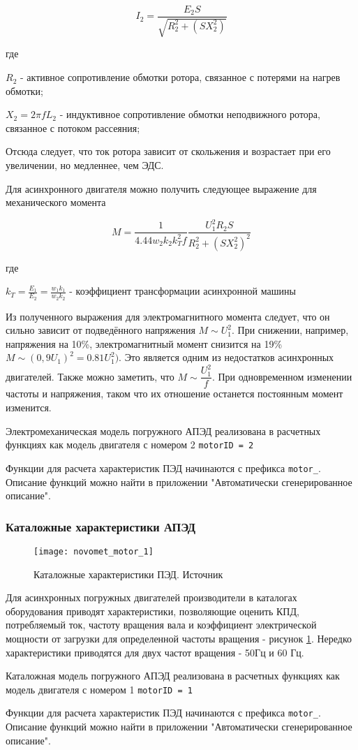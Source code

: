 $$  I_2 = \frac{E_2 S}{\sqrt{R_2^2+(S X_2^2)}} $$

где 

$R_2$ -  активное сопротивление обмотки ротора, связанное с потерями на нагрев обмотки;  

$X_2 = 2 \pi f L_2$ - индуктивное сопротивление обмотки неподвижного ротора, связанное с потоком рассеяния;

Отсюда следует, что ток ротора зависит от скольжения и возрастает при его увеличении, но медленнее, чем ЭДС.

Для асинхронного двигателя можно получить следующее выражение для механического момента 

$$ M = \frac{1}{4.44 w_2 k_2 k_T^2 f} \frac{U_1^2 R_2 S}{R_2^2 + (S X_2^2)^2}$$

где 

$k_T = \frac{E_1}{E_2} = \frac{w_1 k_1}{w_2 k_2}$ - коэффициент трансформации асинхронной машины

Из полученного выражения для электромагнитного момента следует, что он сильно зависит от подведённого напряжения $M \sim U_1^2$. При снижении, например, напряжения на 10\%, электромагнитный момент снизится на 19\% $M \sim (0,9U_1)^2=0.81 U_1^2)$. Это является одним из недостатков асинхронных двигателей. Также можно заметить, что $M \sim \dfrac{U_1^2}{f} $. При одновременном изменении частоты и напряжения, таком что их отношение останется постоянным момент изменится. 


Электромеханическая модель погружного АПЭД реализована в расчетных функциях \unf{} как модель двигателя с номером 2  \texttt{motorID = 2}

Функции для расчета характеристик ПЭД начинаются с префикса \texttt{motor_}. Описание функций можно найти в приложении "Автоматически сгенерированное описание".

\subsubsection{Каталожные характеристики АПЭД}

\begin{figure}[H]
	\centering
	\texttt{[image: novomet\_motor\_1]}
	\caption{Каталожные характеристики ПЭД. Источник \cite{Novomet_2013} }
	\label{ris:novomet_motor_1}
\end{figure}

Для асинхронных погружных двигателей производители в каталогах оборудования приводят характеристики, позволяющие оценить КПД, потребляемый ток, частоту вращения вала и коэффициент электрической мощности от загрузки для определенной частоты вращения - рисунок \ref{ris:novomet_motor_1}. Нередко характеристики приводятся для двух частот вращения - 50Гц и 60 Гц.


Каталожная модель погружного АПЭД реализована в расчетных функциях \unf{} как модель двигателя с номером 1  \texttt{motorID = 1}

Функции для расчета характеристик ПЭД начинаются с префикса \texttt{motor_}. Описание функций можно найти в приложении "Автоматически сгенерированное описание".



\newpage
